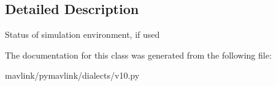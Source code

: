 \subsection{Detailed Description}
\begin{DoxyVerb}Status of simulation environment, if used
\end{DoxyVerb}
 

The documentation for this class was generated from the following file\+:\begin{DoxyCompactItemize}
\item 
mavlink/pymavlink/dialects/v10.\+py\end{DoxyCompactItemize}
